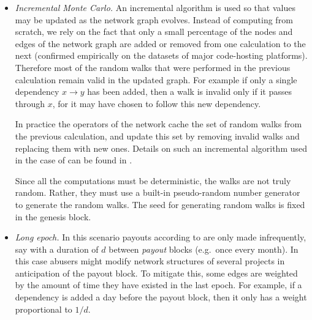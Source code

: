 \begin{itemize}
\item \emph{Incremental Monte Carlo.} An incremental algorithm is used
  so that \osrank{} values may be updated as the network graph
  evolves. Instead of computing \osrank{} from scratch, we rely on the
  fact that only a small percentage of the nodes and edges of the
  network graph are added or removed from one calculation to the next
  (confirmed empirically on the datasets of major code-hosting
  platforms). Therefore most of the random walks that were performed
  in the previous calculation remain valid in the updated graph. For
  example if only a single dependency $x \to y$ has been added, then a
  walk is invalid only if it passes through $x$, for it may have chosen
  to follow this new dependency.

  In practice the operators of the network cache the set of random
  walks from the previous calculation, and update this set by removing
  invalid walks and replacing them with new ones. Details on such an
  incremental algorithm used in the case of \pagerank{} can be found
  in \cite{incr pagerank}.

  Since all the computations must be deterministic, the walks are not
  truly random. Rather, they must use a built-in pseudo-random number
  generator to generate the random walks. The seed for generating
  random walks is fixed in the genesis block.


\item \emph{Long epoch.} In this scenario payouts according to
  \osrank{} are only made infrequently, say with a duration of $d$
  between \emph{payout} blocks (e.g.\ once every month). In this case
  abusers might modify network structures of several projects in
  anticipation of the payout block. To mitigate this, some edges are
  weighted by the amount of time they have existed in the last epoch. For
  example, if a dependency is added a day before the payout block,
  then it only has a weight proportional to $1/d$.
\end{itemize}

